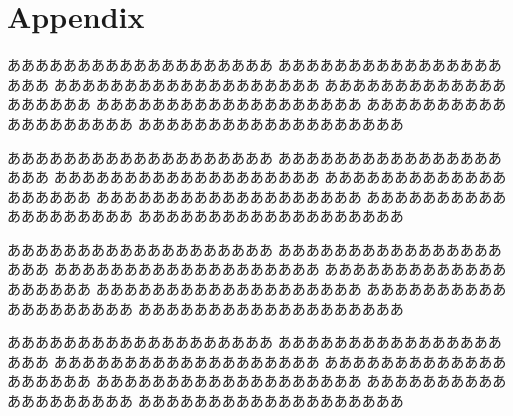 \section{Appendix}
あああああああああああああああああああ
あああああああああああああああああああ
あああああああああああああああああああ
あああああああああああああああああああ
あああああああああああああああああああ
あああああああああああああああああああ
あああああああああああああああああああ

あああああああああああああああああああ
あああああああああああああああああああ
あああああああああああああああああああ
あああああああああああああああああああ
あああああああああああああああああああ
あああああああああああああああああああ
あああああああああああああああああああ

あああああああああああああああああああ
あああああああああああああああああああ
あああああああああああああああああああ
あああああああああああああああああああ
あああああああああああああああああああ
あああああああああああああああああああ
あああああああああああああああああああ

あああああああああああああああああああ
あああああああああああああああああああ
あああああああああああああああああああ
あああああああああああああああああああ
あああああああああああああああああああ
あああああああああああああああああああ
あああああああああああああああああああ
